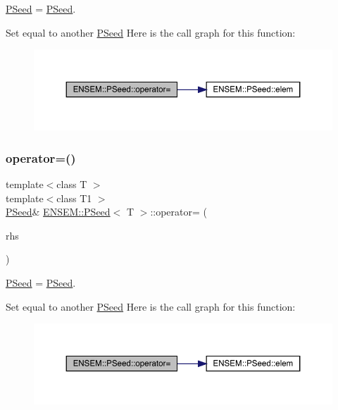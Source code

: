 \mbox{\hyperlink{classENSEM_1_1PSeed}{P\+Seed}} = \mbox{\hyperlink{classENSEM_1_1PSeed}{P\+Seed}}. 

Set equal to another \mbox{\hyperlink{classENSEM_1_1PSeed}{P\+Seed}} Here is the call graph for this function\+:
\nopagebreak
\begin{figure}[H]
\begin{center}
\leavevmode
\includegraphics[width=350pt]{dc/d14/classENSEM_1_1PSeed_a22c88645227bfddbfea703ed71117795_cgraph}
\end{center}
\end{figure}
\mbox{\label{classENSEM_1_1PSeed_a22c88645227bfddbfea703ed71117795}} 
\subsubsection{\texorpdfstring{operator=()}{operator=()}\hspace{0.1cm}{\footnotesize\ttfamily [4/4]}}
{\footnotesize\ttfamily template$<$class T $>$ \\
template$<$class T1 $>$ \\
\mbox{\hyperlink{classENSEM_1_1PSeed}{P\+Seed}}\& \mbox{\hyperlink{classENSEM_1_1PSeed}{E\+N\+S\+E\+M\+::\+P\+Seed}}$<$ T $>$\+::operator= (\begin{DoxyParamCaption}\item[{const \mbox{\hyperlink{classENSEM_1_1PSeed}{P\+Seed}}$<$ T1 $>$ \&}]{rhs }\end{DoxyParamCaption})\hspace{0.3cm}{\ttfamily [inline]}}



\mbox{\hyperlink{classENSEM_1_1PSeed}{P\+Seed}} = \mbox{\hyperlink{classENSEM_1_1PSeed}{P\+Seed}}. 

Set equal to another \mbox{\hyperlink{classENSEM_1_1PSeed}{P\+Seed}} Here is the call graph for this function\+:
\nopagebreak
\begin{figure}[H]
\begin{center}
\leavevmode
\includegraphics[width=350pt]{dc/d14/classENSEM_1_1PSeed_a22c88645227bfddbfea703ed71117795_cgraph}
\end{center}
\end{figure}


